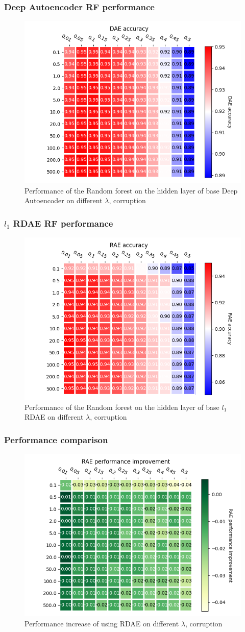 \documentclass{beamer}
\theoremstyle{plain}
\theoremstyle{definition}
\theoremstyle{remark}
\begin{document}
\begin{frame}
	\frametitle{Deep Autoencoder RF performance}
	\begin{figure}
		\centering
		\includegraphics[width=0.65\linewidth]{Images/DAE_acc.png}
		\caption[]{Performance of the Random forest on the hidden layer of base Deep Autoencoder on different $\lambda$, corruption}
	\end{figure}
\end{frame}

\begin{frame}
	\frametitle{$l_1$ RDAE RF performance}
	\begin{figure}
		\centering
		\includegraphics[width=0.65\linewidth]{Images/RAE_acc.png}
		\caption[]{Performance of the Random forest on the hidden layer of base $l_1$ RDAE on different $\lambda$, corruption}
	\end{figure}
\end{frame}

\begin{frame}
	\frametitle{Performance comparison}
	\begin{figure}
		\centering
		\includegraphics[width=0.7\linewidth]{Images/performance.png}
		\caption[]{Performance increase of using RDAE on different $\lambda$, corruption}
	\end{figure}
\end{frame}
\end{document}
